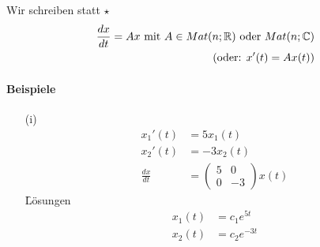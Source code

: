 Wir schreiben statt $\star$
\begin{align}
\frac{dx}{dt} = Ax \text{ mit } A\in Mat(n; \mathbb{R}) \text{ oder } Mat(n; \mathbb{C}) \\
(\text{oder: } x'(t) = Ax(t))
\end{align}

\paragraph{Beispiele}
\begin{itemize}
\item[(i)]
\begin{align}
x_1'(t) &= 5x_1(t) \\
x_2'(t) &= -3x_2(t) \\
\frac{dx}{dt} &= \begin{pmatrix} 5 & 0 \\ 0 & -3\end{pmatrix} x(t)
\end{align}
\f{Lösungen}
\begin{align}
x_1(t) &= c_1 e^{5t} \\
x_2(t) &= c_2 e^{-3t} \\
\end{align}


\end{itemize}
